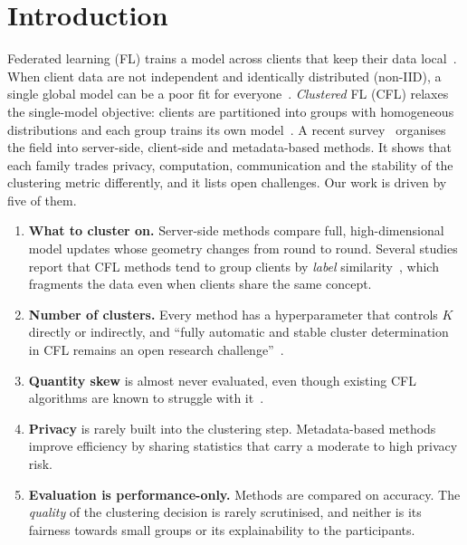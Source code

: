 \documentclass[11pt]{article}
\theoremstyle{definition}
\theoremstyle{remark}
\begin{document}
\section{Introduction}
Federated learning (FL) trains a model across clients that keep their data local~\citep{mcmahan2017fedavg,kairouz2021advances}. When client data are not independent and identically distributed (non-IID), a single global model can be a poor fit for everyone~\citep{zhao2018noniid}. \emph{Clustered} FL (CFL) relaxes the single-model objective: clients are partitioned into groups with homogeneous distributions and each group trains its own model~\citep{sattler2021cfl,ghosh2020ifca,briggs2020flhc}. A recent survey~\citep{benali2026survey} organises the field into server-side, client-side and metadata-based methods. It shows that each family trades privacy, computation, communication and the stability of the clustering metric differently, and it lists open challenges. Our work is driven by five of them.
\begin{enumerate}[leftmargin=*,itemsep=1pt]
\item \textbf{What to cluster on.} Server-side methods compare full, high-dimensional model updates whose geometry changes from round to round. Several studies report that CFL methods tend to group clients by \emph{label} similarity~\citep{guo2024fedrc}, which fragments the data even when clients share the same concept.
\item \textbf{Number of clusters.} Every method has a hyperparameter that controls $K$ directly or indirectly, and ``fully automatic and stable cluster determination in CFL remains an open research challenge''~\citep{benali2026survey}.
\item \textbf{Quantity skew} is almost never evaluated, even though existing CFL algorithms are known to struggle with it~\citep{benali2025cornflqs}.
\item \textbf{Privacy} is rarely built into the clustering step. Metadata-based methods improve efficiency by sharing statistics that carry a moderate to high privacy risk.
\item \textbf{Evaluation is performance-only.} Methods are compared on accuracy. The \emph{quality} of the clustering decision is rarely scrutinised, and neither is its fairness towards small groups or its explainability to the participants.
\end{enumerate}
\end{document}
